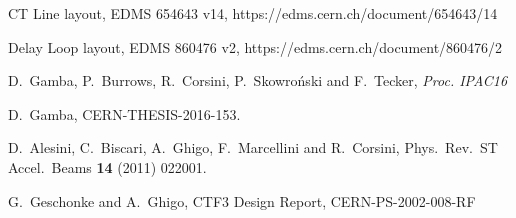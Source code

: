 \begin{thebibliography}{99}



 CT Line layout, EDMS 654643 v14, https://edms.cern.ch/document/654643/14

 Delay Loop layout, EDMS 860476 v2, https://edms.cern.ch/document/860476/2


  D.~Gamba, P.~Burrows, R.~Corsini, P.~Skowro\'nski and F.~Tecker,
  \emph{Proc. IPAC16}


  D.~Gamba,
  CERN-THESIS-2016-153.


  D.~Alesini, C.~Biscari, A.~Ghigo, F.~Marcellini and R.~Corsini,
  Phys.\ Rev.\ ST Accel.\ Beams {\bf 14} (2011) 022001.
  
  G.~Geschonke and A.~Ghigo, CTF3 Design Report, CERN-PS-2002-008-RF



\end{thebibliography}
